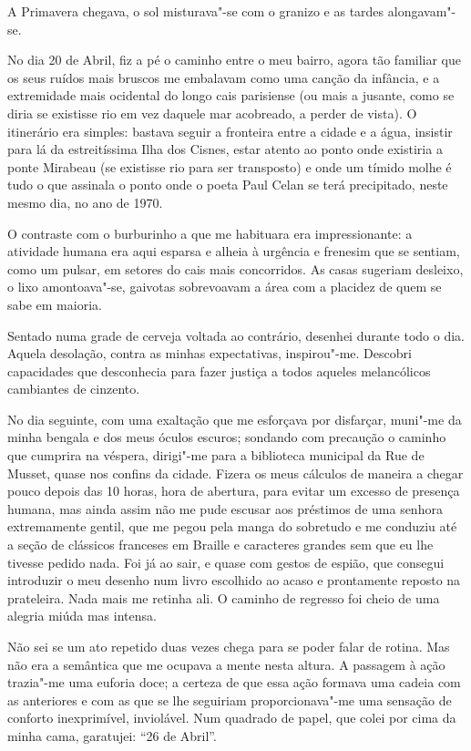 A Primavera chegava, o sol misturava"-se com o granizo e as tardes
alongavam"-se.

No dia 20 de Abril, fiz a pé o caminho entre o meu bairro, agora tão
familiar que os seus ruídos mais bruscos me embalavam como uma canção
da infância, e a extremidade mais ocidental do longo cais parisiense (ou
mais a jusante, como se diria se existisse rio em vez daquele mar
acobreado, a perder de vista). O itinerário era simples: bastava seguir
a fronteira entre a cidade e a água, insistir para lá da estreitíssima
Ilha dos Cisnes, estar atento ao ponto onde existiria a ponte Mirabeau
(se existisse rio para ser transposto) e onde um tímido molhe é tudo o
que assinala o ponto onde o poeta Paul Celan se terá precipitado, neste
mesmo dia, no ano de 1970.

O contraste com o burburinho a que me habituara era
impressionante: a atividade humana era aqui esparsa e alheia à urgência
e frenesim que se sentiam, como um pulsar, em setores do cais mais
concorridos. As casas sugeriam desleixo, o lixo amontoava"-se, gaivotas
sobrevoavam a área com a placidez de quem se sabe em maioria.

Sentado numa grade de cerveja voltada ao contrário, desenhei durante
todo o dia. Aquela desolação, contra as minhas expectativas,
inspirou"-me. Descobri capacidades que desconhecia para fazer justiça a
todos aqueles melancólicos cambiantes de cinzento.

No dia seguinte, com uma exaltação que me esforçava por disfarçar,
muni"-me da minha bengala e dos meus óculos escuros; sondando com
precaução o caminho que cumprira na véspera, dirigi"-me para a biblioteca
municipal da Rue de Musset, quase nos confins da cidade. Fizera os meus
cálculos de maneira a chegar pouco depois das 10 horas, hora de abertura, para evitar um excesso de presença humana, mas ainda assim não me
pude escusar aos préstimos de uma senhora extremamente gentil, que me
pegou pela manga do sobretudo e me conduziu até a seção de clássicos
franceses em Braille e caracteres grandes sem que eu lhe tivesse pedido
nada. Foi já ao sair, e quase com gestos de espião, que consegui
introduzir o meu desenho num livro escolhido ao acaso e prontamente
reposto na prateleira. Nada mais me retinha ali. O caminho de regresso
foi cheio de uma alegria miúda mas intensa.

Não sei se um ato repetido duas vezes chega para se poder falar de
rotina. Mas não era a semântica que me ocupava a mente nesta altura. A
passagem à ação trazia"-me uma euforia doce; a certeza de que essa ação
formava uma cadeia com as anteriores e com as que se lhe seguiriam
proporcionava"-me uma sensação de conforto inexprimível, inviolável. Num
quadrado de papel, que colei por cima da minha cama, garatujei: ``26
de Abril''.

